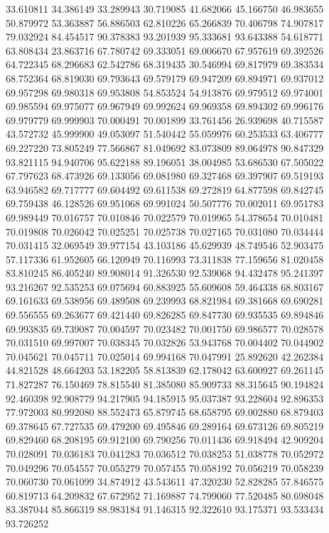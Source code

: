 33.610811
34.386149
33.289943
30.719085
41.682066
45.166750
46.983655
50.879972
53.363887
56.886503
62.810226
65.266839
70.406798
74.907817
79.032924
84.454517
90.378383
93.201939
95.333681
93.643388
54.618771
63.808434
23.863716
67.780742
69.333051
69.006670
67.957619
69.392526
64.722345
68.296683
62.542786
68.319435
30.546994
69.817979
69.383534
68.752364
68.819030
69.793643
69.579179
69.947209
69.894971
69.937012
69.957298
69.980318
69.953808
54.853524
54.913876
69.979512
69.974001
69.985594
69.975077
69.967949
69.992624
69.969358
69.894302
69.996176
69.979779
69.999903
70.000491
70.001899
33.761456
26.939698
40.715587
43.572732
45.999900
49.053097
51.540442
55.059976
60.253533
63.406777
69.227220
73.805249
77.566867
81.049692
83.073809
89.064978
90.847329
93.821115
94.940706
95.622188
89.196051
38.004985
53.686530
67.505022
67.797623
68.473926
69.133056
69.081980
69.327468
69.397907
69.519193
63.946582
69.717777
69.604492
69.611538
69.272819
64.877598
69.842745
69.759438
46.128526
69.951068
69.991024
50.507776
70.002011
69.951783
69.989449
70.016757
70.010846
70.022579
70.019965
54.378654
70.010481
70.019808
70.026042
70.025251
70.025738
70.027165
70.031080
70.034444
70.031415
32.069549
39.977154
43.103186
45.629939
48.749546
52.903475
57.117336
61.952605
66.120949
70.116993
73.311838
77.159656
81.020458
83.810245
86.405240
89.908014
91.326530
92.539068
94.432478
95.241397
93.216267
92.535253
69.075694
60.883925
55.609608
59.464338
68.803167
69.161633
69.538956
69.489508
69.239993
68.821984
69.381668
69.690281
69.556555
69.263677
69.421440
69.826285
69.847730
69.935535
69.894846
69.993835
69.739087
70.004597
70.023482
70.001750
69.986577
70.028578
70.031510
69.997007
70.038345
70.032826
53.943768
70.004402
70.044902
70.045621
70.045711
70.025014
69.994168
70.047991
25.892620
42.262384
44.821528
48.664203
53.182205
58.813839
62.178042
63.600927
69.261145
71.827287
76.150469
78.815540
81.385080
85.909733
88.315645
90.194824
92.460398
92.908779
94.217905
94.185915
95.037387
93.228604
92.896353
77.972003
80.992080
88.552473
65.879745
68.658795
69.002880
68.879403
69.378645
67.727535
69.479200
69.495846
69.289164
69.673126
69.805219
69.829460
68.208195
69.912100
69.790256
70.011436
69.918494
42.909204
70.028091
70.036183
70.041283
70.036512
70.038253
51.038778
70.052972
70.049296
70.054557
70.055279
70.057455
70.058192
70.056219
70.058239
70.060730
70.061099
34.874912
43.543611
47.320230
52.828285
57.846575
60.819713
64.209832
67.672952
71.169887
74.799060
77.520485
80.698048
83.387044
85.866319
88.983184
91.146315
92.322610
93.175371
93.533434
93.726252
